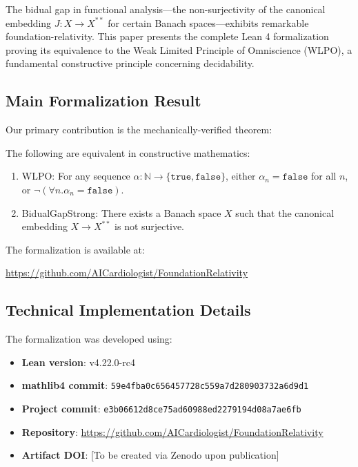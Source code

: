 \documentclass{lmcs}
\begin{document}
The bidual gap in functional analysis---the non-surjectivity of the canonical embedding $J: X \to X^{**}$ for certain Banach spaces---exhibits remarkable foundation-relativity. This paper presents the complete Lean 4 formalization proving its equivalence to the Weak Limited Principle of Omniscience (WLPO), a fundamental constructive principle concerning decidability.

\subsection{Main Formalization Result}

Our primary contribution is the mechanically-verified theorem:

\begin{theorem}\label{thm:main}
The following are equivalent in constructive mathematics:
\begin{enumerate}
\item WLPO: For any sequence $\alpha : \mathbb{N} \to \{\mathtt{true}, \mathtt{false}\}$, either $\alpha_n = \mathtt{false}$ for all $n$, or $\neg(\forall n. \alpha_n = \mathtt{false})$.
\item BidualGapStrong: There exists a Banach space $X$ such that the canonical embedding $X \to X^{**}$ is not surjective.
\end{enumerate}
\end{theorem}

The formalization is available at:
\begin{center}
\url{https://github.com/AICardiologist/FoundationRelativity}
\end{center}

\subsection{Technical Implementation Details}

The formalization was developed using:
\begin{itemize}
\item \textbf{Lean version}: v4.22.0-rc4
\item \textbf{mathlib4 commit}: \texttt{59e4fba0c656457728c559a7d280903732a6d9d1}
\item \textbf{Project commit}: \texttt{e3b06612d8ce75ad60988ed2279194d08a7ae6fb}
\item \textbf{Repository}: \url{https://github.com/AICardiologist/FoundationRelativity}
\item \textbf{Artifact DOI}: [To be created via Zenodo upon publication]
\end{itemize}
\end{document}
